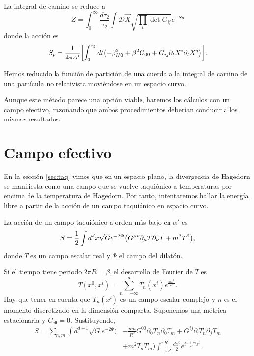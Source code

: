 La integral de camino se reduce a 
\begin{equation}
  Z=\int_0^\infty \frac{d\tau_2}{\tau_2}\int \mathcal D \vec {X} \sqrt{\prod_t \det G_{ij}}e^{-Sp}
  \label{eq:final}
\end{equation}
donde la acción es
\begin{equation}
  S_p=\frac{1}{4\pi\alpha'}\qty[\int_0^{\tau_2}dt \qty(-\beta^2_{H0}+\beta^2 G_{00}+G_{ij}\partial_t X^i\partial_t X^j)].
\end{equation}

Hemos reducido la función de partición de una cuerda a la integral de camino de
una partícula no relativista moviéndose en un espacio curvo.

Aunque este método parece una opción viable, haremos los cálculos con un campo efectivo, razonando
que ambos procedimientos deberían conducir a los mismos resultados.

\section{Campo efectivo}
En la sección \ref{sec:taq} vimos que en un espacio plano, la divergencia de Hagedorn se manifiesta
como una campo que se vuelve taquiónico a temperaturas por encima de la temperatura de
Hagedorn.
Por tanto, intentaremos hallar la energía libre a partir de la acción de un campo taquiónico
en espacio curvo.

La acción de un campo taquiónico a orden más bajo en $\alpha'$ es
\begin{equation}
  S=\frac{1}{2}\int d^d x\sqrt G e^{-2\Phi}  \qty(G^{\mu\nu}\partial_\mu T\partial_\nu T+m^2T^2),
\end{equation}
donde $T$ es un campo escalar real y $\Phi$ el campo del dilatón.

Si el tiempo tiene periodo $2\pi R=\beta$, el desarrollo de Fourier de $T$ es
\begin{equation}
  T(x^0,x^i)=\sum_{n=-\infty}^{\infty} T_n(x^i)e^{\frac{inx^0}{R}}.
\end{equation}
Hay que tener en cuenta que $T_n(x^i)$ es un campo escalar complejo
y $n$ es el momento discretizado en la dimensión compacta.
Suponemos una métrica estacionaria y $G_{i0}=0$.
Sustituyendo,
\begin{equation}
  \begin{aligned}
    S=\sum_{n,m} \int d^{d-1} \sqrt{G}e^{-2\Phi}\biggl(&-\frac{nm}{R^2}G^{00}\partial_0 T_n \partial_0 T_{m} 
    + G^{ij}\partial_i T_n \partial_j T_{m} \\
    &+ m^2 T_n T_{m}\biggl) \int_{-\pi R}^{\pi R} \frac{dx^0}{2}e^{i\frac{n+m}{R}x^0}.
  \end{aligned}
\end{equation}

